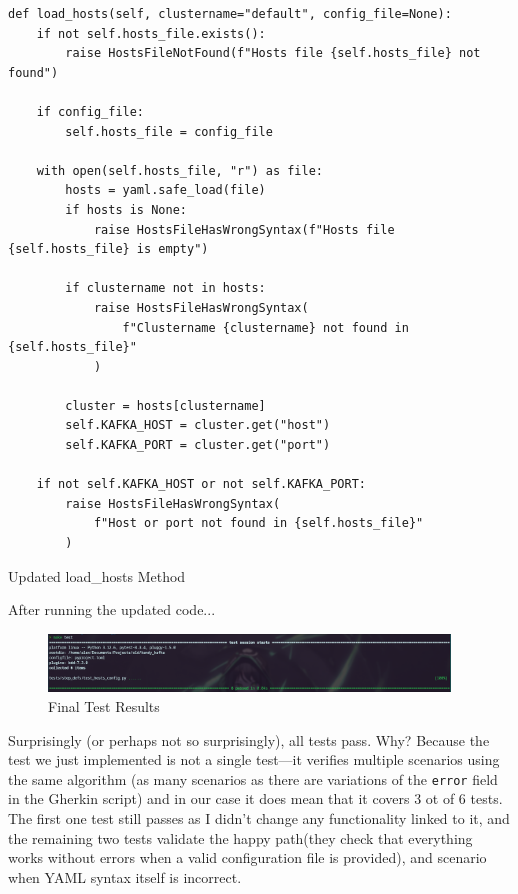 \documentclass[10pt , a4paper]{report}
\newenvironment{code}{\captionsetup{type=listing}}{}
\begin{document}
\begin{code}
  \begin{verbatim}
def load_hosts(self, clustername="default", config_file=None):
    if not self.hosts_file.exists():
        raise HostsFileNotFound(f"Hosts file {self.hosts_file} not found")

    if config_file:
        self.hosts_file = config_file

    with open(self.hosts_file, "r") as file:
        hosts = yaml.safe_load(file)
        if hosts is None:
            raise HostsFileHasWrongSyntax(f"Hosts file {self.hosts_file} is empty")

        if clustername not in hosts:
            raise HostsFileHasWrongSyntax(
                f"Clustername {clustername} not found in {self.hosts_file}"
            )

        cluster = hosts[clustername]
        self.KAFKA_HOST = cluster.get("host")
        self.KAFKA_PORT = cluster.get("port")

    if not self.KAFKA_HOST or not self.KAFKA_PORT:
        raise HostsFileHasWrongSyntax(
            f"Host or port not found in {self.hosts_file}"
        )
  \end{verbatim}
  \caption{Updated load\_hosts Method}
\end{code}

After running the updated code...

\begin{figure}[htbp]
  \begin{center}
    \includegraphics[width=0.95\textwidth]{imgs/FinalBehaviourTest.png}
  \end{center}
  \caption{Final Test Results}
\end{figure}

Surprisingly (or perhaps not so surprisingly), all tests pass. Why? Because the test we just implemented is not a single test—it verifies multiple scenarios using the same algorithm (as many scenarios as there are variations of the \texttt{error} field in the Gherkin script) and in our case it does mean that it covers 3 ot of 6 tests. The first one test still passes as I didn't change any functionality linked to it, and the remaining two tests validate the happy path(they check that everything works without errors when a valid configuration file is provided), and scenario when YAML syntax itself is incorrect. 
\end{document}
